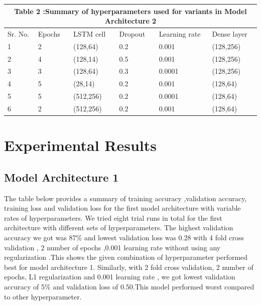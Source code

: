 \documentclass{article}
\begin{document}
\begin{tabular}[H]{ | p{0.5cm}|| p{2cm}||p{2cm}||p{2cm}||p{2.5cm}||p{2cm}|}
\hline
 \multicolumn{6}{|c|}{ Table 2 :Summary of hyperparameters used for variants in Model Architecture 2 } \\
 \hline
 Sr. No. & Epochs & LSTM cell & Dropout & Learning rate & Dense layer \\
 \hline
 1 & 2 & (128,64) & 0.2 & 0.001 & (128,256)  \\ 
 2 & 4 & (128,14) & 0.5 & 0.001 & (128,256)  \\
 3 & 3 & (128,64) & 0.3 & 0.0001 & (128,256)  \\
 4 & 5 & (28,14) & 0.2 & 0.001 & (128,64)  \\
 5 & 5 & (512,256) & 0.2 & 0.0001 & (128,64) \\
 6 & 2 & (512,256) & 0.2 & 0.001 & (128,64) \\
 \hline
\end{tabular}


\section{Experimental Results}
\subsection{Model Architecture 1}
The table below provides a summary  of  training accuracy ,validation accuracy, training loss and validation loss for the first model architecture with variable rates of  hyperparameters. We tried eight trial runs in total for the first architecture with different sets of hyperparameters. The highest validation accuracy we got was 87\%  and  lowest validation loss was 0.28 with 4 fold cross validation , 2 number of epochs ,0.001 learning rate without using any  regularization .This shows the given combination of hyperparameter performed best for model architecture 1. Similarly, with 2 fold cross validation, 2 number of epochs, L1 regularization and 0.001 learning rate , we got lowest validation accuracy of  5\%  and validation loss of 0.50.This model performed worst compared to other hyperparameter.\newline
\end{document}
